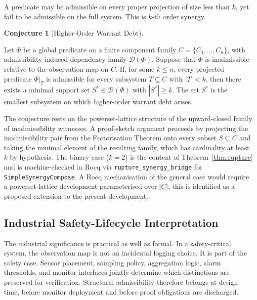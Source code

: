 \documentclass[pdflatex,sn-mathphys-num]{sn-jnl}
\theoremstyle{plain}
\theoremstyle{definition}
\newtheorem{conjecture}[theorem]{Conjecture}
\theoremstyle{remark}
\begin{document}
A predicate may be admissible on every proper projection of size less
than $k$, yet fail to be admissible on the full system.
This is $k$-th order synergy.

\begin{conjecture}[Higher-Order Warrant Debt]
\label{thm:higher-order}

Let $\Phi$ be a global predicate on a finite component family
$C = \{C_1,\ldots,C_n\}$, with admissibility-induced dependency family
$\mathcal{D}(\Phi)$.
Suppose that $\Phi$ is inadmissible relative to the observation map on
$C$.
If, for some $k \leq n$, every projected predicate $\Phi|_T$ is
admissible for every subsystem $T \subseteq C$ with $|T| < k$, then
there exists a minimal support set $S^* \in \mathcal{D}(\Phi)$ with
$|S^*| \geq k$.
The set $S^*$ is the smallest subsystem on which higher-order warrant
debt arises.

\end{conjecture}

The conjecture rests on the powerset-lattice structure of the upward-closed
family of inadmissibility witnesses.
A proof-sketch argument proceeds by projecting the inadmissibility pair
from the Factorisation Theorem onto every subset $S \subseteq C$ and
taking the minimal element of the resulting family, which has cardinality
at least $k$ by hypothesis.
The binary case ($k = 2$) is the content of
Theorem~\ref{thm:rupture} and is machine-checked in Rocq via
\texttt{rupture\_synergy\_bridge} for \texttt{SimpleSynergyCompose}.
A Rocq mechanisation of the general case would require a
powerset-lattice development parameterised over $|C|$; this is
identified as a proposed extension to the present development.

\subsection{Industrial Safety-Lifecycle Interpretation}

The industrial significance is practical as well as formal.
In a safety-critical system, the observation map is not an incidental
logging choice.
It is part of the safety case.
Sensor placement, sampling policy, aggregation logic, alarm thresholds,
and monitor interfaces jointly determine which distinctions are preserved
for verification.
Structural admissibility therefore belongs at design time, before monitor
deployment and before proof obligations are discharged.
\end{document}
